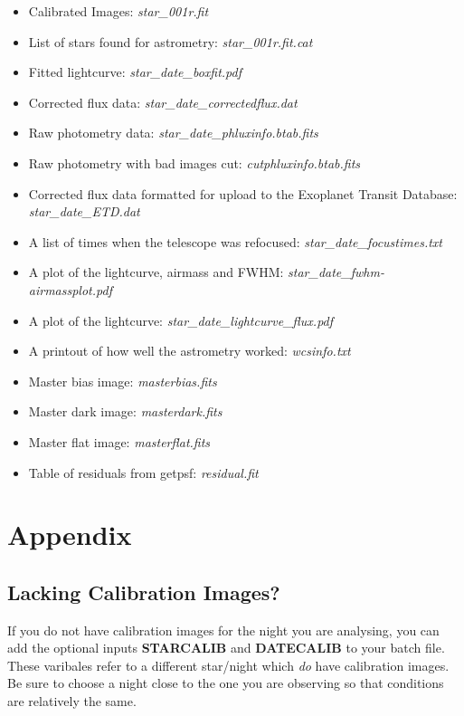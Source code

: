 \documentclass[10pt,preprint]{aastex}
\begin{document}
\begin{itemize}
\item Calibrated Images: \emph{star\_001r.fit}
\item List of stars found for astrometry: \emph{star\_001r.fit.cat}
\item Fitted lightcurve: \emph{star\_date\_boxfit.pdf}
\item Corrected flux data: \emph{star\_date\_correctedflux.dat}
\item Raw photometry data: \emph{star\_date\_phluxinfo.btab.fits}
\item Raw photometry with bad images cut: \emph{cutphluxinfo.btab.fits}
\item Corrected flux data formatted for upload to the Exoplanet Transit Database: \emph{star\_date\_ETD.dat}
\item A list of times when the telescope was refocused: \emph{star\_date\_focustimes.txt}
\item A plot of the lightcurve, airmass and FWHM: \emph{star\_date\_fwhm-airmassplot.pdf}
\item A plot of the lightcurve: \emph{star\_date\_lightcurve\_flux.pdf}
\item A printout of how well the astrometry worked: \emph{wcsinfo.txt}
\item Master bias image: \emph{masterbias.fits}
\item Master dark image: \emph{masterdark.fits}
\item Master flat image: \emph{masterflat.fits}
\item Table of residuals from getpsf: \emph{residual.fit}

\end{itemize}

\clearpage

\section{Appendix}

\subsection{Lacking Calibration Images?}

If you do not have calibration images for the night you are analysing, you can add the optional inputs \textbf{STARCALIB} and 
\textbf{DATECALIB} to your batch file. These varibales refer to a different star/night which \emph{do} have calibration images.
 Be sure to choose a night close to the one you are observing so that conditions are relatively the same. 
\end{document}
